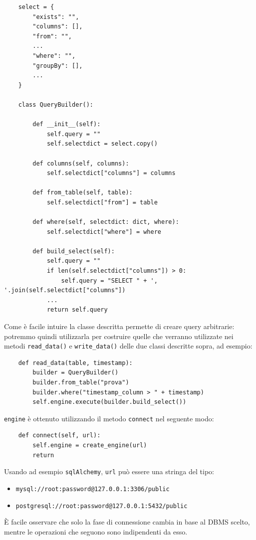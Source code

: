 \documentclass[a4paper]{article}
\begin{document}
\begin{lstlisting}
    select = {
        "exists": "",
        "columns": [],
        "from": "",
        ...
        "where": "",
        "groupBy": [],
        ...
    }

    class QueryBuilder():

        def __init__(self):
            self.query = ""
            self.selectdict = select.copy()

        def columns(self, columns):
            self.selectdict["columns"] = columns

        def from_table(self, table):
            self.selectdict["from"] = table

        def where(self, selectdict: dict, where):
            self.selectdict["where"] = where

        def build_select(self):
            self.query = ""
            if len(self.selectdict["columns"]) > 0:
                self.query = "SELECT " + ', '.join(self.selectdict["columns"])
            ...
            return self.query
\end{lstlisting}
Come è facile intuire la classe descritta permette di creare query arbitrarie:
potremmo quindi utilizzarla per costruire quelle che verranno utilizzate nei
metodi \texttt{read\_data()} e \texttt{write\_data()} delle due classi
descritte sopra, ad esempio:
\begin{lstlisting}
    def read_data(table, timestamp):
        builder = QueryBuilder()
        builder.from_table("prova")
        builder.where("timestamp_column > " + timestamp)
        self.engine.execute(builder.build_select())
\end{lstlisting}
\texttt{engine} è ottenuto utilizzando il metodo \texttt{connect} nel seguente
modo:
\begin{lstlisting}
    def connect(self, url):
        self.engine = create_engine(url)
        return
\end{lstlisting}
Usando ad esempio \texttt{sqlAlchemy}, \texttt{url} può essere una stringa del
tipo:
\begin{itemize}
    \item \texttt{mysql://root:password@127.0.0.1:3306/public}
    \item \texttt{postgresql://root:password@127.0.0.1:5432/public}
\end{itemize}
È facile osservare che solo la fase di connessione cambia in base al DBMS
scelto, mentre le operazioni che seguono sono indipendenti da esso.
\end{document}
